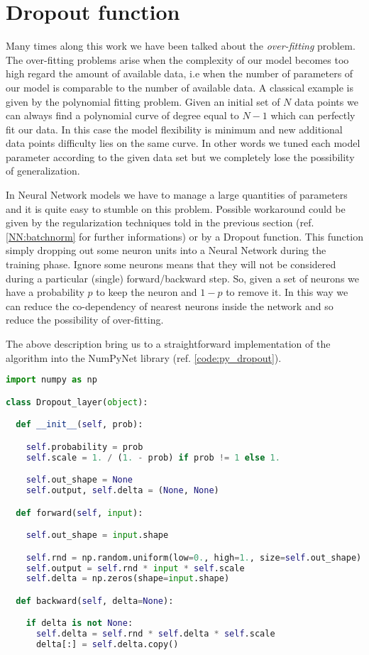 \documentclass{standalone}
\begin{document}
\section[Dropout function]{Dropout function}\label{NN:dropout}

Many times along this work we have been talked about the \emph{over-fitting} problem.
The over-fitting problems arise when the complexity of our model becomes too high regard the amount of available data, i.e when the number of parameters of our model is comparable to the number of available data.
A classical example is given by the polynomial fitting problem.
Given an initial set of $N$ data points we can always find a polynomial curve of degree equal to $N-1$ which can perfectly fit our data.
In this case the model flexibility is minimum and new additional data points difficulty lies on the same curve.
In other words we tuned each model parameter according to the given data set but we completely lose the possibility of generalization.

In Neural Network models we have to manage a large quantities of parameters and it is quite easy to stumble on this problem.
Possible workaround could be given by the regularization techniques told in the previous section (ref. \ref{NN:batchnorm} for further informations) or by a Dropout function.
This function simply dropping out some neuron units into a Neural Network during the training phase.
Ignore some neurons means that they will not be considered during a particular (single) forward/backward step.
So, given a set of neurons we have a probability $p$ to keep the neuron and $1-p$ to remove it.
In this way we can reduce the co-dependency of nearest neurons inside the network and so reduce the possibility of over-fitting.

The above description bring us to a straightforward implementation of the algorithm into the NumPyNet library (ref. \ref{code:py_dropout}).

\lstset{style=snippet}
\begin{lstlisting}[language=Python, caption=NumPyNet version of Dropout function, label=code:py_dropout]
import numpy as np

class Dropout_layer(object):

  def __init__(self, prob):

    self.probability = prob
    self.scale = 1. / (1. - prob) if prob != 1 else 1.

    self.out_shape = None
    self.output, self.delta = (None, None)

  def forward(self, input):

    self.out_shape = input.shape

    self.rnd = np.random.uniform(low=0., high=1., size=self.out_shape) < self.probability
    self.output = self.rnd * input * self.scale
    self.delta = np.zeros(shape=input.shape)

  def backward(self, delta=None):

    if delta is not None:
      self.delta = self.rnd * self.delta * self.scale
      delta[:] = self.delta.copy()

\end{lstlisting}
\end{document}
